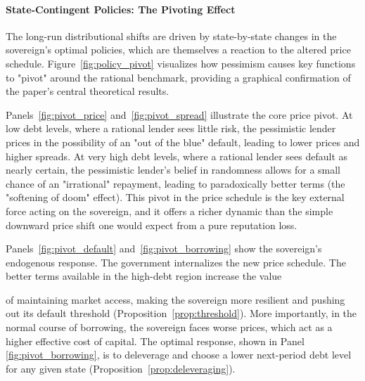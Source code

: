 \documentclass[12pt]{article}
\theoremstyle{plain}
\begin{document}
\paragraph{State-Contingent Policies: The Pivoting Effect}
The long-run distributional shifts are driven by state-by-state changes in the
sovereign's optimal policies, which are themselves a reaction to the altered
price schedule. Figure~\ref{fig:policy_pivot} visualizes how pessimism causes
key functions to "pivot" around the rational benchmark, providing a graphical
confirmation of the paper's central theoretical results.

Panels~\ref{fig:pivot_price} and~\ref{fig:pivot_spread} illustrate the core
price pivot. At low debt levels, where a rational lender sees little risk, the
pessimistic lender prices in the possibility of an "out of the blue" default,
leading to lower prices and higher spreads. At very high debt levels, where a
rational lender sees default as nearly certain, the pessimistic lender's belief
in randomness allows for a small chance of an "irrational" repayment, leading
to paradoxically better terms (the "softening of doom" effect). This pivot in
the price schedule is the key external force acting on the sovereign, and it
offers a richer dynamic than the simple downward price shift one would expect
from a pure reputation loss.

Panels~\ref{fig:pivot_default} and~\ref{fig:pivot_borrowing} show the
sovereign's endogenous response. The government internalizes the new price
schedule. The better terms available in the high-debt region increase the value

of maintaining market access, making the sovereign more resilient and pushing
out its default threshold (Proposition~\ref{prop:threshold}). More importantly,
in the normal course of borrowing, the sovereign faces worse prices, which act
as a higher effective cost of capital. The optimal response, shown in Panel
\ref{fig:pivot_borrowing}, is to deleverage and choose a lower next-period debt
level for any given state (Proposition~\ref{prop:deleveraging}).
\end{document}
